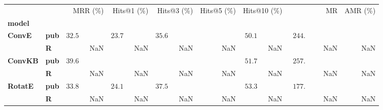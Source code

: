\begin{tabular}{llrrrrrrr}
\toprule
       &   &                    MRR (\%) &                 Hits@1 (\%) &                 Hits@3 (\%) & Hits@5 (\%) &                Hits@10 (\%) &                                       MR & AMR (\%) \\
\textbf{model} & {} &                             &                             &                             &             &                             &                                          &          \\
\midrule
\textbf{ConvE} & \textbf{pub} &  $32.5\phantom{0 \pm 0.00}$ &  $23.7\phantom{0 \pm 0.00}$ &  $35.6\phantom{0 \pm 0.00}$ &             &  $50.1\phantom{0 \pm 0.00}$ &  $\phantom{0}244.\phantom{00 \pm 00.00}$ &          \\
       & \textbf{R} &                         NaN &                         NaN &                         NaN &         NaN &                         NaN &                                      NaN &      NaN \\\midrule
\textbf{ConvKB} & \textbf{pub} &  $39.6\phantom{0 \pm 0.00}$ &                             &                             &             &  $51.7\phantom{0 \pm 0.00}$ &  $\phantom{0}257.\phantom{00 \pm 00.00}$ &          \\
       & \textbf{R} &                         NaN &                         NaN &                         NaN &         NaN &                         NaN &                                      NaN &      NaN \\\midrule
\textbf{RotatE} & \textbf{pub} &  $33.8\phantom{0 \pm 0.00}$ &  $24.1\phantom{0 \pm 0.00}$ &  $37.5\phantom{0 \pm 0.00}$ &             &  $53.3\phantom{0 \pm 0.00}$ &  $\phantom{0}177.\phantom{00 \pm 00.00}$ &          \\
       & \textbf{R} &                         NaN &                         NaN &                         NaN &         NaN &                         NaN &                                      NaN &      NaN \\
\bottomrule
\end{tabular}

